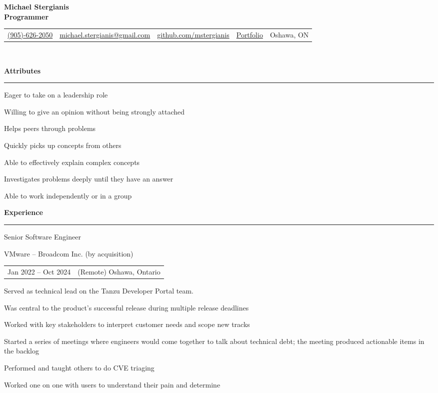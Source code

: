\documentclass[letterpaper]{article}
\makeatletter
\newcommand{\primary}{\color{primary}}
\newcommand{\primarydark}{\color{primarydark}}
\newcommand{\complementary}{\color{complementary}}
\newcommand{\mapMarker}{\faMapMarker*[alt]}
\newcommand{\email}
{\faEnvelope \space \href{mailto:michaelstergianis@gmail.com}{michael.stergianis@gmail.com}}
\newcommand{\github}
{\faGithub \space \href{https://github.com/mstergianis}{github.com/mstergianis}}
\newcommand{\phone}
{\faPhone \space \href{tel:+1-905-626-2050}{(905)-626-2050}}
\newcommand{\portfolio}
{\faBriefcase \space \href{https://michael.stergianis.ca}{Portfolio}}
\newcommand{\location}
{\mapMarker \space Oshawa, ON}
\newenvironment{heading}[1]{%
  {\LARGE \primarydark \textbf{#1}}\\ {\complementary
    \rule[5pt]{\linewidth}{0.6pt}}
}
{\par\vspace{8pt}}
\newcommand{\blockend}{\vspace{4pt}}
\newenvironment{experience}[4]{
  { #1 \par}
  {\small \primary #2 \par}
  \begin{tabularx}{\linewidth}{ l l }
    { \small \faCalendar \space #3 } & { \small \mapMarker \space #4 }
  \end{tabularx}%
}{
  \blockend{}
}
\newenvironment{itemize*}%
{\begin{itemize}[topsep=0pt,leftmargin=20pt]%
    \setlength{\itemsep}{0pt}%
    \setlength{\parsep}{0pt}%
    \setlength{\parskip}{0pt}%
    \small%
  }%
  {\end{itemize}}
\makeatother
\begin{document}
{\huge \textbf{Michael Stergianis}}\\
{\large \primary \textbf{Programmer}}
\\

\begingroup
\hypersetup{
  urlcolor=.,
}
\begin{tabularx}{\linewidth}{ l l l l l }
  \phone & \email & \github & \portfolio & \location \\
\end{tabularx}\\
\endgroup

\begin{minipage}[t]{0.59\textwidth}%
  \begin{heading}{Attributes}
    \begin{itemize*}
    \item Eager to take on a leadership role
    \item Willing to give an opinion without being strongly attached
    \item Helps peers through problems
    \item Quickly picks up concepts from others
    \item Able to effectively explain complex concepts
    \item Investigates problems deeply until they have an answer
    \item Able to work independently or in a group
    \end{itemize*}
  \end{heading}
  \begin{heading}{Experience}%
    \begin{experience}{Senior Software Engineer}
      {VMware -- Broadcom Inc. (by acquisition)}
      {Jan 2022 -- Oct 2024}
      {(Remote) Oshawa, Ontario}
      Served as technical lead on the Tanzu Developer Portal team.
      \begin{itemize*}
      \item Was central to the product's successful release during multiple
        release deadlines
      \item Worked with key stakeholders to interpret customer needs and scope
        new tracks
      \item Started a series of meetings where engineers would come together to
        talk about technical debt; the meeting produced actionable items in the
        backlog
      \item Performed and taught others to do CVE triaging
      \item Worked one on one with users to understand their pain and determine

\end{itemize*}
\end{experience}
\end{heading}
\end{minipage}
\end{document}
